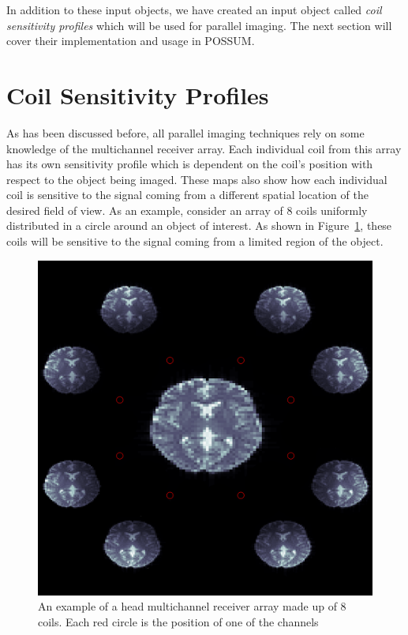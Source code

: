 In addition to these input objects, we have created an input object called \textit{coil sensitivity profiles} which will be used for parallel imaging. The next section will cover their implementation and usage in POSSUM.

\section{Coil Sensitivity Profiles}
As has been discussed before, all parallel imaging techniques rely on some knowledge of the multichannel receiver array. Each individual coil from this array has its own sensitivity profile which is dependent on the coil's position with respect to the object being imaged. These maps also show how each individual coil is sensitive to the signal coming from a different spatial location of the desired field of view. As an example, consider an array of 8 coils uniformly distributed in a circle around an object of interest. As shown in Figure~\ref{fig:8coils}, these coils will be sensitive to the signal coming from a limited region of the object.

\begin{figure}[H]
    \centering
    \includegraphics[width=1\textwidth,keepaspectratio]{9brains}
    \caption{An example of a head multichannel receiver array made up of 8 coils. Each red circle is the position of one of the channels}
    \label{fig:8coils}
\end{figure}

